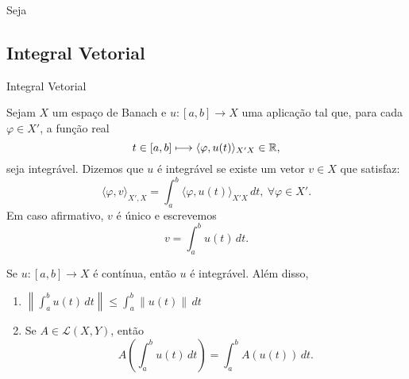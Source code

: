 \begin{frame}{}
 Seja    
\end{frame}


\subsection*{Integral Vetorial}

\begin{frame}{Integral Vetorial}
\begin{defin}
Sejam $X$ um espaço de Banach e $u:[a,b]\longrightarrow X$ uma aplicação tal que, para cada $\varphi\in X'$,  a função real
\[t\in [a,b] \longmapsto \langle\varphi, u(t) \rangle_{X'X}\in \mathbb{R},\]
seja integrável. Dizemos que $u$ é integrável se existe {\color{blue} um vetor $v\in X$} que satisfaz:
\[\langle \varphi, v\rangle_{X',X}=\int_a^b \langle\varphi, u(t) \rangle_{X'X}\,dt,\ \forall \varphi\in X'.\]
Em caso afirmativo, $v$ é único e escrevemos
\[v=\int_a^b u(t)\,dt.\]

\end{defin}
\end{frame}

\begin{frame}{ }
\begin{prop}
Se $u:[a,b]\longrightarrow X$ é {\color{blue}contínua}, então $u$ é integrável. Além disso, 
\begin{enumerate}
    \item $\displaystyle\left\|\int_a^b u(t)\,dt\right\|\leq \int_a^b \|u(t)\|\,dt$
    \item Se $A\in \mathcal{L}(X,Y)$, então
    \[ A\left(\int_a^b u(t)\,dt\right)=\int_a^b A(u(t))\,dt. \]
\end{enumerate}

\end{prop}
\end{frame}
